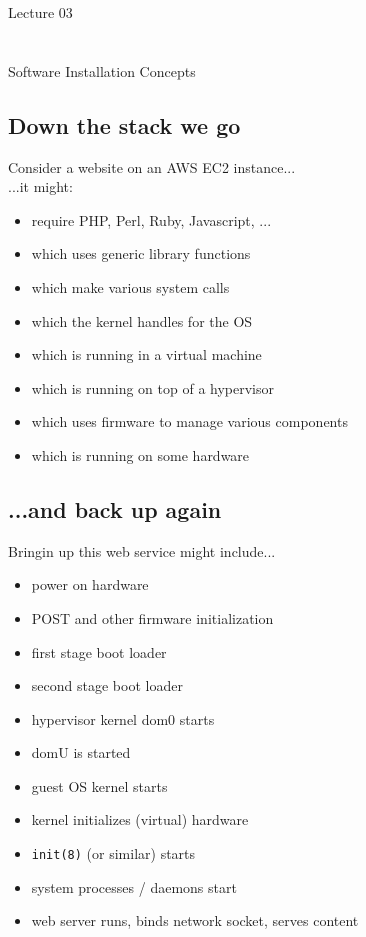 \documentclass[xga]{xdvislides}
\begin{document}
\newpage
\vspace*{\fill}
\begin{center}
    \Hugesize
        Lecture 03 \\ [1em]
    \hspace*{5mm}
    \blueline\\
    \hspace*{5mm}\\
	Software Installation Concepts
\end{center}
\vspace*{\fill}

\subsection{Down the stack we go}
Consider a website on an AWS EC2 instance...
\\

...it might:

\begin{itemize}
	\item require PHP, Perl, Ruby, Javascript, ...
	\item which uses generic library functions
	\item which make various system calls
	\item which the kernel handles for the OS
	\item which is running in a virtual machine
	\item which is running on top of a hypervisor
	\item which uses firmware to manage various components
	\item which is running on some hardware
\end{itemize}


\subsection{...and back up again}
Bringin up this web service might include...
\\

\begin{itemize}
	\item power on hardware
	\item POST and other firmware initialization
	\item first stage boot loader
	\item second stage boot loader
	\item hypervisor kernel dom0 starts
	\item domU is started
	\item guest OS kernel starts
	\item kernel initializes (virtual) hardware
	\item {\tt init(8)} (or similar) starts
	\item system processes / daemons start
	\item web server runs, binds network socket, serves content
\end{itemize}
\end{document}
